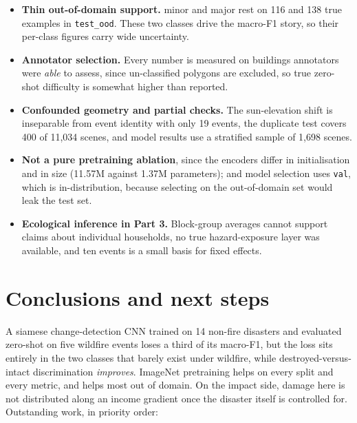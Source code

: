 \documentclass[10pt,twocolumn]{article}
\newcommand{\class}[1]{\textsf{#1}}
\begin{document}
\begin{itemize}[leftmargin=*,itemsep=2pt,topsep=3pt]
\item \textbf{Thin out-of-domain support.} \class{minor} and \class{major} rest on 116 and 138 true
examples in \texttt{test\_ood}. These two classes drive the macro-F1 story, so their per-class figures
carry wide uncertainty.
\item \textbf{Annotator selection.} Every number is measured on buildings annotators were \emph{able}
to assess, since \class{un-classified} polygons are excluded, so true zero-shot difficulty is
somewhat higher than reported.
\item \textbf{Confounded geometry and partial checks.} The sun-elevation shift is inseparable from
event identity with only 19 events, the duplicate test covers 400 of 11,034 scenes, and model results
use a stratified sample of 1,698 scenes.
\item \textbf{Not a pure pretraining ablation}, since the encoders differ in initialisation and in
size (11.57M against 1.37M parameters); and model selection uses \texttt{val}, which is
in-distribution, because selecting on the out-of-domain set would leak the test set.
\item \textbf{Ecological inference in Part 3.} Block-group averages cannot support claims about
individual households, no true hazard-exposure layer was available, and ten events is a small basis
for fixed effects.
\end{itemize}

\section{Conclusions and next steps}

A siamese change-detection CNN trained on 14 non-fire disasters and evaluated zero-shot on five
wildfire events loses a third of its macro-F1, but the loss sits entirely in the two classes that
barely exist under wildfire, while destroyed-versus-intact discrimination \emph{improves}. ImageNet
pretraining helps on every split and every metric, and helps most out of domain. On the impact side,
damage here is not distributed along an income gradient once the disaster itself is controlled for.
Outstanding work, in priority order:
\end{document}
